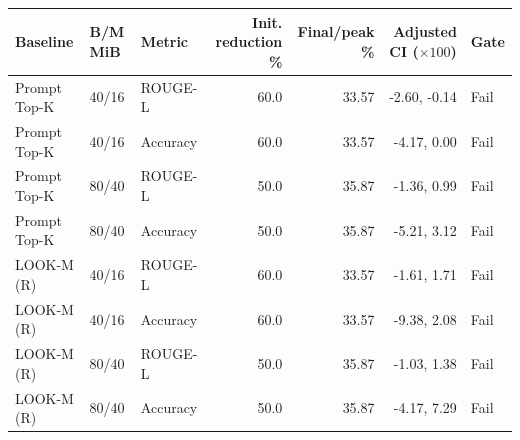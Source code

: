 \begin{tabular}{lllrrrl}
\toprule
Baseline & B/M MiB & Metric & Init. reduction \% & Final/peak \% & Adjusted CI ($\times100$) & Gate\\\midrule
Prompt Top-K & 40/16 & ROUGE-L & 60.0 & 33.57 & -2.60, -0.14 & Fail\\
Prompt Top-K & 40/16 & Accuracy & 60.0 & 33.57 & -4.17, 0.00 & Fail\\
Prompt Top-K & 80/40 & ROUGE-L & 50.0 & 35.87 & -1.36, 0.99 & Fail\\
Prompt Top-K & 80/40 & Accuracy & 50.0 & 35.87 & -5.21, 3.12 & Fail\\
LOOK-M (R) & 40/16 & ROUGE-L & 60.0 & 33.57 & -1.61, 1.71 & Fail\\
LOOK-M (R) & 40/16 & Accuracy & 60.0 & 33.57 & -9.38, 2.08 & Fail\\
LOOK-M (R) & 80/40 & ROUGE-L & 50.0 & 35.87 & -1.03, 1.38 & Fail\\
LOOK-M (R) & 80/40 & Accuracy & 50.0 & 35.87 & -4.17, 7.29 & Fail\\
\bottomrule
\end{tabular}
